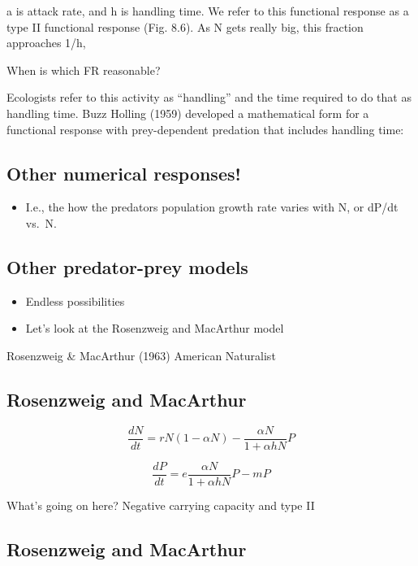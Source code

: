 \documentclass[
  letterpaper,
  DIV=11,
  numbers=noendperiod]{scrartcl}
\providecommand{\tightlist}{%
  \setlength{\itemsep}{0pt}\setlength{\parskip}{0pt}}\usepackage{longtable,booktabs,array}
\begin{document}
a is attack rate, and h is handling time. We refer to this functional
response as a type II functional response (Fig. 8.6). As N gets really
big, this fraction approaches 1/h,

When is which FR reasonable?

Ecologists refer to this activity as ``handling'' and the time required
to do that as handling time. Buzz Holling (1959) developed a
mathematical form for a functional response with prey-dependent
predation that includes handling time:

\hypertarget{other-numerical-responses}{%
\subsection{Other numerical
responses!}\label{other-numerical-responses}}

\begin{itemize}
\tightlist
\item
  I.e., the how the predators population growth rate varies with N, or
  dP/dt vs.~N.
\end{itemize}

\hypertarget{other-predator-prey-models-1}{%
\subsection{Other predator-prey
models}\label{other-predator-prey-models-1}}

\begin{itemize}
\item
  Endless possibilities
\item
  Let's look at the Rosenzweig and MacArthur model
\end{itemize}

Rosenzweig \& MacArthur (1963) American Naturalist

\hypertarget{rosenzweig-and-macarthur}{%
\subsection{Rosenzweig and MacArthur}\label{rosenzweig-and-macarthur}}

\[\frac{dN}{dt}=r N(1-\alpha N) - \frac{\alpha N}{1+\alpha h N}P\]

\[\frac{dP}{dt}=e\frac{\alpha N}{1+\alpha h N}P -m P\]

What's going on here? Negative carrying capacity and type II

\hypertarget{rosenzweig-and-macarthur-1}{%
\subsection{Rosenzweig and MacArthur}\label{rosenzweig-and-macarthur-1}}
\end{document}
